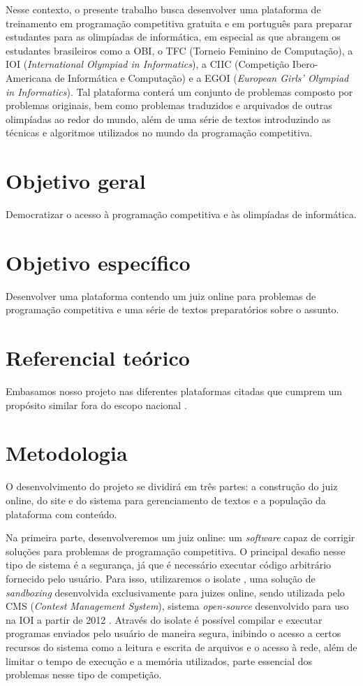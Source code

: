 \documentclass[oneside,12pt,article,a4paper,english,brazil]{abntex2}
\begin{document}
Nesse contexto, o presente trabalho busca desenvolver uma plataforma de treinamento em programação competitiva gratuita e em português para preparar estudantes para as olimpíadas de informática, em especial as que abrangem os estudantes brasileiros como a OBI, o TFC (Torneio Feminino de Computação), a IOI (\emph{International Olympiad in Informatics}), a CIIC (Competição Ibero-Americana de Informática e Computação) e a EGOI (\emph{European Girls' Olympiad in Informatics}). Tal plataforma conterá um conjunto de problemas composto por problemas originais, bem como problemas traduzidos e arquivados de outras olimpíadas ao redor do mundo, além de uma série de textos introduzindo as técnicas e algoritmos utilizados no mundo da programação competitiva.

\section{Objetivo geral}
Democratizar o acesso à programação competitiva e às olimpíadas de informática. 

\section{Objetivo específico}
Desenvolver uma plataforma contendo um juiz online para problemas de programação competitiva e uma série de textos preparatórios sobre o assunto.

\section{Referencial teórico}
Embasamos nosso projeto nas diferentes plataformas citadas que cumprem um propósito similar fora do escopo nacional \cite{usaco-ioi} \cite{cses-ioi}.

\section{Metodologia}
O desenvolvimento do projeto se dividirá em três partes: a construção do juiz online, do site e do sistema para gerenciamento de textos e a população da plataforma com conteúdo.

Na primeira parte, desenvolveremos um juiz online: um \emph{software} capaz de corrigir soluções para problemas de programação competitiva. O principal desafio nesse tipo de sistema é a segurança, já que é necessário executar código arbitrário fornecido pelo usuário. Para isso, utilizaremos o isolate \cite{isolate-ioi}, uma solução de \emph{sandboxing} desenvolvida exclusivamente para juizes online, sendo utilizada pelo CMS (\emph{Contest Management System}), sistema \emph{open-source} desenvolvido para uso na IOI a partir de 2012 \cite{cms-ioi}. Através do isolate é possível compilar e executar programas enviados pelo usuário de maneira segura, inibindo o acesso a certos recursos do sistema como a leitura e escrita de arquivos e o acesso à rede, além de limitar o tempo de execução e a memória utilizados, parte essencial dos problemas nesse tipo de competição.
\end{document}
